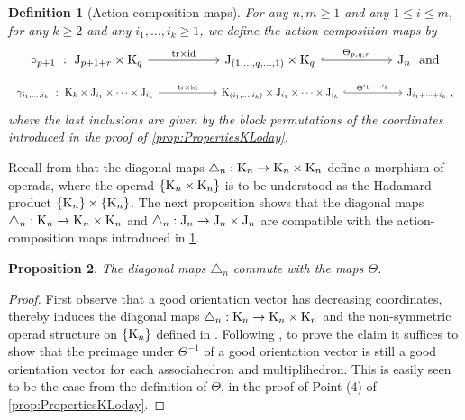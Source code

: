 \documentclass[twoside, 11pt]{amsart}
\newtheorem{definition}{Definition}[section]
\newtheorem{proposition}[definition]{Proposition}
\theoremstyle{remark}
\begin{document}
\begin{definition}[Action-composition maps] \label{def:action-composition}
For any $n,m\geq 1$ and any $1\leq i \leq m$, for any $k\geq 2$ and any $i_1,\ldots,i_k \geq 1$, we define the \emph{action-composition maps}  by 
\[
\vcenter{\hbox{
\begin{tikzcd}[column sep=1cm]
\circ_{p+1}\ : \ \J_{p+1+r}\times \K_q
\arrow[rr,  "\tr\times \id"]
& & 
\J_{(1,\ldots,q,\ldots,1)}\times \K_q 
\arrow[rr,hookrightarrow, "\Theta_{p,q,r}"]
&  &
\J_{n}\ \ \text{and}
\end{tikzcd}
}}
\]
\[
\vcenter{\hbox{
\begin{tikzcd}[column sep=1cm]
\gamma_{i_1,\ldots,i_k}\ : \ \K_{k}\times \J_{i_1} \times \cdots \times \J_{i_k}
\arrow[rr,  "\tr\times \id"]
& &
\K_{(i_1,\ldots,i_k)} \times \J_{i_1} \times \cdots \times \J_{i_k} 
\arrow[rr,hookrightarrow, "\Theta^{i_1, \ldots , i_k}"]
& &
\J_{i_1+\cdots + i_k}\ , 
\end{tikzcd}
}}
\]
where the last inclusions are given by the block permutations of the coordinates introduced in the proof of \cref{prop:PropertiesKLoday}. 
\end{definition}

Recall from \cite[Theorem 1]{MTTV19} that the diagonal maps $\triangle_n : \mathrm{K}_n \to \mathrm{K}_n \times \mathrm{K}_n$ define a morphism of operads, where the operad $\{ \mathrm{K}_n \times \mathrm{K}_n \}$ is to be understood as the Hadamard product $\{ \mathrm{K}_n \} \times \{ \mathrm{K}_n \}$.
The next proposition shows that the diagonal maps $\triangle_n : \mathrm{K}_n \to \mathrm{K}_n \times \mathrm{K}_n$ and $\triangle_n : \mathrm{J}_n \to \mathrm{J}_n \times \mathrm{J}_n$ are compatible with the action-composition maps introduced in \cref{def:action-composition}.

\begin{proposition} 
\label{prop:thetacommutes}
The diagonal maps $\triangle_n$ commute with the maps $\Theta$.  
\end{proposition}

\begin{proof}
First observe that a good orientation vector has decreasing coordinates, thereby induces the diagonal maps $\triangle_n : \mathrm{K}_n \to \mathrm{K}_n \times \mathrm{K}_n$ and the non-symmetric operad structure on $\{\mathrm{K}_n\}$ defined in \cite{MTTV19}. 
Following \cite[Proposition 4.14]{LA21}, to prove the claim it suffices to show that the preimage under $\Theta^{-1}$ of a good orientation vector is still a good orientation vector for each associahedron and multiplihedron. 
This is easily seen to be the case from the definition of $\Theta$, in the proof of Point (4) of \cref{prop:PropertiesKLoday}. 
\end{proof}
\end{document}
